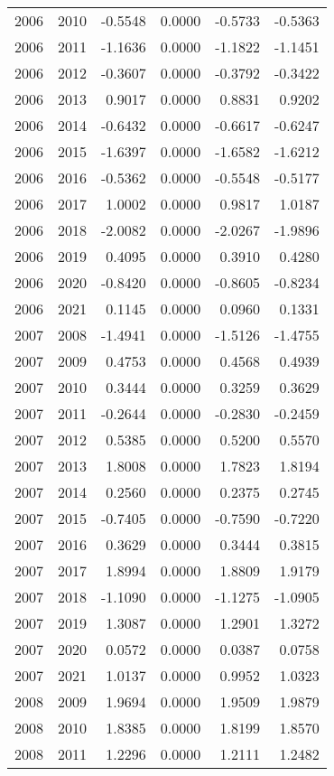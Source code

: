 \begin{tabular}{llrrrr}
2006 & 2010 & -0.5548 & 0.0000 & -0.5733 & -0.5363 \\
2006 & 2011 & -1.1636 & 0.0000 & -1.1822 & -1.1451 \\
2006 & 2012 & -0.3607 & 0.0000 & -0.3792 & -0.3422 \\
2006 & 2013 & 0.9017 & 0.0000 & 0.8831 & 0.9202 \\
2006 & 2014 & -0.6432 & 0.0000 & -0.6617 & -0.6247 \\
2006 & 2015 & -1.6397 & 0.0000 & -1.6582 & -1.6212 \\
2006 & 2016 & -0.5362 & 0.0000 & -0.5548 & -0.5177 \\
2006 & 2017 & 1.0002 & 0.0000 & 0.9817 & 1.0187 \\
2006 & 2018 & -2.0082 & 0.0000 & -2.0267 & -1.9896 \\
2006 & 2019 & 0.4095 & 0.0000 & 0.3910 & 0.4280 \\
2006 & 2020 & -0.8420 & 0.0000 & -0.8605 & -0.8234 \\
2006 & 2021 & 0.1145 & 0.0000 & 0.0960 & 0.1331 \\
2007 & 2008 & -1.4941 & 0.0000 & -1.5126 & -1.4755 \\
2007 & 2009 & 0.4753 & 0.0000 & 0.4568 & 0.4939 \\
2007 & 2010 & 0.3444 & 0.0000 & 0.3259 & 0.3629 \\
2007 & 2011 & -0.2644 & 0.0000 & -0.2830 & -0.2459 \\
2007 & 2012 & 0.5385 & 0.0000 & 0.5200 & 0.5570 \\
2007 & 2013 & 1.8008 & 0.0000 & 1.7823 & 1.8194 \\
2007 & 2014 & 0.2560 & 0.0000 & 0.2375 & 0.2745 \\
2007 & 2015 & -0.7405 & 0.0000 & -0.7590 & -0.7220 \\
2007 & 2016 & 0.3629 & 0.0000 & 0.3444 & 0.3815 \\
2007 & 2017 & 1.8994 & 0.0000 & 1.8809 & 1.9179 \\
2007 & 2018 & -1.1090 & 0.0000 & -1.1275 & -1.0905 \\
2007 & 2019 & 1.3087 & 0.0000 & 1.2901 & 1.3272 \\
2007 & 2020 & 0.0572 & 0.0000 & 0.0387 & 0.0758 \\
2007 & 2021 & 1.0137 & 0.0000 & 0.9952 & 1.0323 \\
2008 & 2009 & 1.9694 & 0.0000 & 1.9509 & 1.9879 \\
2008 & 2010 & 1.8385 & 0.0000 & 1.8199 & 1.8570 \\
2008 & 2011 & 1.2296 & 0.0000 & 1.2111 & 1.2482 \\

\end{tabular}
